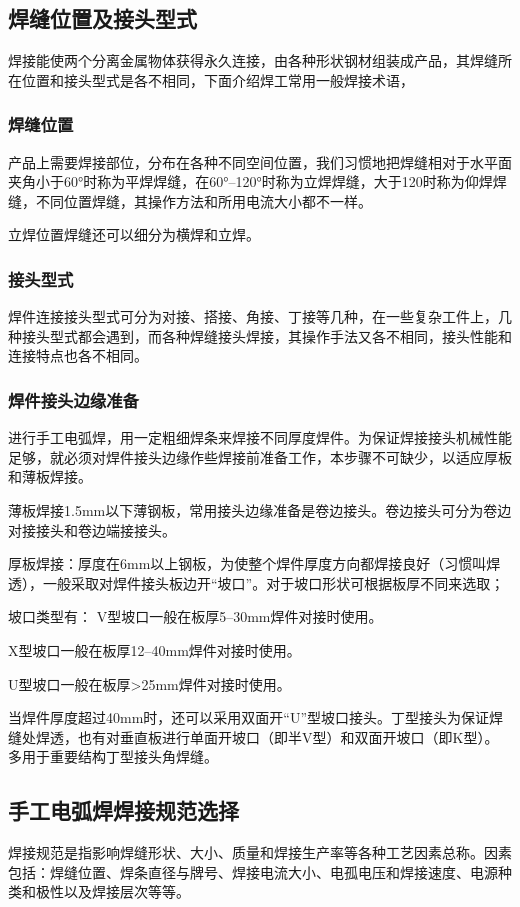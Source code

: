 \documentclass{ctexbook}
\begin{document}
\subsection{焊缝位置及接头型式}
焊接能使两个分离金属物体获得永久连接，由各种形状钢材组装成产品，其焊缝所在位置和接头型式是各不相同，下面介绍焊工常用一般焊接术语，
\subsubsection{焊缝位置}
产品上需要焊接部位，分布在各种不同空间位置，我们习惯地把焊缝相对于水平面夹角小于60°时称为平焊焊缝，在60°--120°时称为立焊焊缝，大于120时称为仰焊焊缝，不同位置焊缝，其操作方法和所用电流大小都不一样。

立焊位置焊缝还可以细分为横焊和立焊。
\subsubsection{接头型式}
焊件连接接头型式可分为对接、搭接、角接、丁接等几种，在一些复杂工件上，几种接头型式都会遇到，而各种焊缝接头焊接，其操作手法又各不相同，接头性能和连接特点也各不相同。
\subsubsection{焊件接头边缘准备}
进行手工电弧焊，用一定粗细焊条来焊接不同厚度焊件。为保证焊接接头机械性能足够，就必须对焊件接头边缘作些焊接前准备工作，本步骤不可缺少，以适应厚板和薄板焊接。

薄板焊接1.5mm以下薄钢板，常用接头边缘准备是卷边接头。卷边接头可分为卷边对接接头和卷边端接接头。

厚板焊接：厚度在6mm以上钢板，为使整个焊件厚度方向都焊接良好（习惯叫焊透），一般采取对焊件接头板边开“坡口”。对于坡口形状可根据板厚不同来选取；

坡口类型有：
V型坡口一般在板厚5--30mm焊件对接时使用。

X型坡口一般在板厚12--40mm焊件对接时使用。

U型坡口一般在板厚>25mm焊件对接时使用。

当焊件厚度超过40mm时，还可以采用双面开“U”型坡口接头。丁型接头为保证焊缝处焊透，也有对垂直板进行单面开坡口（即半V型）和双面开坡口（即K型）。多用于重要结构丁型接头角焊缝。
\subsection{手工电弧焊焊接规范选择}
焊接规范是指影响焊缝形状、大小、质量和焊接生产率等各种工艺因素总称。因素包括：焊缝位置、焊条直径与牌号、焊接电流大小、电孤电压和焊接速度、电源种类和极性以及焊接层次等等。
\end{document}
